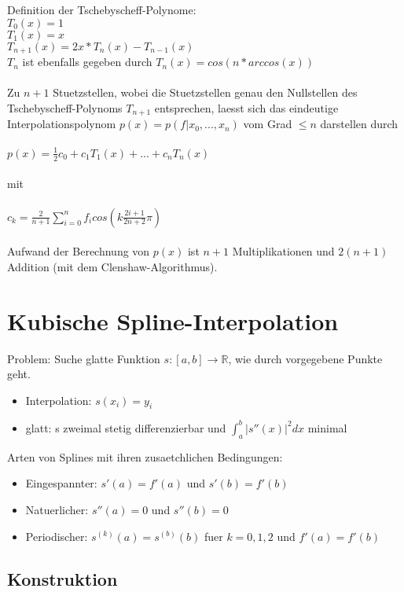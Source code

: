 \documentclass[a4paper]{scrreprt}
\begin{document}
Definition der Tschebyscheff-Polynome:\\
$T_0(x) = 1$\\
$T_1(x) = x$\\
$T_{n+1}(x) = 2x * T_n(x)-T_{n-1}(x)$\\

$T_n$ ist ebenfalls gegeben durch $T_n(x) = cos(n*arccos(x))$\\\\

Zu $n+1$ Stuetzstellen, wobei die Stuetzstellen genau den Nullstellen des Tschebyscheff-Polynoms $T_{n+1}$ entsprechen, laesst sich das eindeutige Interpolationspolynom $p(x) = p(f|x_0,...,x_n)$ vom Grad $\leq n$ darstellen durch\\\\
$p(x) = \frac{1}{2}c_0+c_1T_1(x) + ...+ c_nT_n(x)$\\\\
mit\\\\
$c_k = \frac{2}{n+1}\sum_{i=0}^nf_icos(k\frac{2i+1}{2n+2}\pi)$\\\\
Aufwand der Berechnung von $p(x)$ ist $n+1$ Multiplikationen und $2(n+1)$ Addition (mit dem Clenshaw-Algorithmus).

\section{Kubische Spline-Interpolation}

Problem: Suche glatte Funktion $s:[a,b]\rightarrow\mathbb{R}$, wie durch vorgegebene Punkte geht.
\begin{itemize}
	\item Interpolation: $s(x_i) = y_i$
	\item glatt: s zweimal stetig differenzierbar und $\int_a^b|s''(x)|^2dx$ minimal
\end{itemize}

Arten von Splines mit ihren zusaetchlichen Bedingungen:

\begin{itemize}
	\item Eingespannter: $s'(a) = f'(a)$ und $s'(b) = f'(b)$
	\item Natuerlicher: $s''(a) = 0$ und $s''(b) = 0$
	\item Periodischer: $s^{(k)}(a) = s^{(b)}(b)$ fuer $k = 0,1,2$ und $f'(a) = f'(b)$
\end{itemize}

\subsection{Konstruktion}
\end{document}
